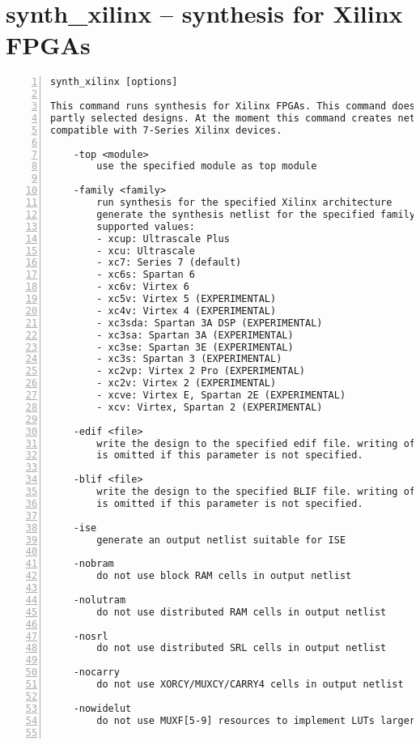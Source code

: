 \section{synth\_xilinx -- synthesis for Xilinx FPGAs}
\label{cmd:synth_xilinx}
\begin{lstlisting}[numbers=left,frame=single]
    synth_xilinx [options]

This command runs synthesis for Xilinx FPGAs. This command does not operate on
partly selected designs. At the moment this command creates netlists that are
compatible with 7-Series Xilinx devices.

    -top <module>
        use the specified module as top module

    -family <family>
        run synthesis for the specified Xilinx architecture
        generate the synthesis netlist for the specified family.
        supported values:
        - xcup: Ultrascale Plus
        - xcu: Ultrascale
        - xc7: Series 7 (default)
        - xc6s: Spartan 6
        - xc6v: Virtex 6
        - xc5v: Virtex 5 (EXPERIMENTAL)
        - xc4v: Virtex 4 (EXPERIMENTAL)
        - xc3sda: Spartan 3A DSP (EXPERIMENTAL)
        - xc3sa: Spartan 3A (EXPERIMENTAL)
        - xc3se: Spartan 3E (EXPERIMENTAL)
        - xc3s: Spartan 3 (EXPERIMENTAL)
        - xc2vp: Virtex 2 Pro (EXPERIMENTAL)
        - xc2v: Virtex 2 (EXPERIMENTAL)
        - xcve: Virtex E, Spartan 2E (EXPERIMENTAL)
        - xcv: Virtex, Spartan 2 (EXPERIMENTAL)

    -edif <file>
        write the design to the specified edif file. writing of an output file
        is omitted if this parameter is not specified.

    -blif <file>
        write the design to the specified BLIF file. writing of an output file
        is omitted if this parameter is not specified.

    -ise
        generate an output netlist suitable for ISE

    -nobram
        do not use block RAM cells in output netlist

    -nolutram
        do not use distributed RAM cells in output netlist

    -nosrl
        do not use distributed SRL cells in output netlist

    -nocarry
        do not use XORCY/MUXCY/CARRY4 cells in output netlist

    -nowidelut
        do not use MUXF[5-9] resources to implement LUTs larger than native for the target


\end{lstlisting}
